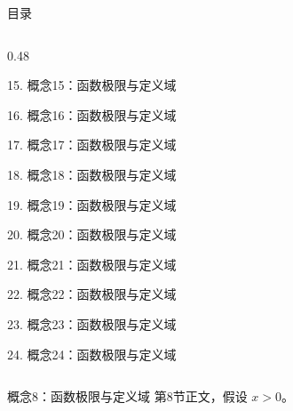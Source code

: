 \documentclass[aspectratio=169,10pt,fontset=fandol]{ctexbeamer}
\begin{document}
\begin{frame}[t,fragile]{目录}
\begin{columns}[T,onlytextwidth]
\begin{column}{0.48\textwidth}
{\color{gray!40}\small 15. 概念15：函数极限与定义域\par}\vspace{0.22em}
{\color{gray!40}\small 16. 概念16：函数极限与定义域\par}\vspace{0.22em}
{\color{gray!40}\small 17. 概念17：函数极限与定义域\par}\vspace{0.22em}
{\color{gray!40}\small 18. 概念18：函数极限与定义域\par}\vspace{0.22em}
{\color{gray!40}\small 19. 概念19：函数极限与定义域\par}\vspace{0.22em}
{\color{gray!40}\small 20. 概念20：函数极限与定义域\par}\vspace{0.22em}
{\color{gray!40}\small 21. 概念21：函数极限与定义域\par}\vspace{0.22em}
{\color{gray!40}\small 22. 概念22：函数极限与定义域\par}\vspace{0.22em}
{\color{gray!40}\small 23. 概念23：函数极限与定义域\par}\vspace{0.22em}
{\color{gray!40}\small 24. 概念24：函数极限与定义域\par}\vspace{0.22em}
\end{column}
\end{columns}
\end{frame}
\begin{frame}[t,fragile]{概念8：函数极限与定义域}
\normalsize
{\normalsize
第8节正文，假设 $x>0$。
}
\end{frame}
\end{document}
